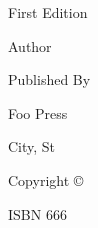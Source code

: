 \setcounter{page}{-1}

\thispagestyle{empty}

\begin{figure}[p] %
\end{figure}
\restoregeometry %

\thispagestyle{empty}

\frontmatter
\begin{titlepage}
    \thispagestyle{empty}
    \begin{center}
        \LARGE
        \textbf{\booktitle}
        
        \vspace*{1.5in}
        \Large
        First Edition
        
        \vspace*{1.5in}
        \Large
        Author
        
        \vspace*{\fill}
    \end{center}
    \newpage
    \thispagestyle{empty}
    \begin{center}
        \vspace*{\fill}
        Published By
        
        Foo Press
        
        City, St
        
        Copyright \copyright{}

        ISBN 666
    \end{center}
\end{titlepage}

\thispagestyle{empty}
\tableofcontents
\thispagestyle{empty}
